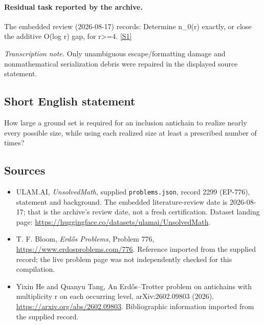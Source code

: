 \documentclass[11pt,a4paper]{article}
\newcommand{\sref}[2]{\hyperlink{source:#1:#2}{[S#2]}}
\begin{document}
\paragraph{Residual task reported by the archive.}

The embedded review (2026-08-17) records: Determine n\_0(r) exactly, or close the additive O(log r) gap, for r>=4. \sref{2299}{1}

{\small\emph{Transcription note.} Only unambiguous escape/formatting damage and nonmathematical serialization debris were repaired in the displayed source statement.}

\subsection{Short English statement}

How large a ground set is required for an inclusion antichain to realize nearly every possible size, while using each realized size at least a prescribed number of times?

\subsection{Sources}

{\small

\begin{itemize}

\item[\hypertarget{source:2299:1}{S1}] ULAM.AI, \emph{UnsolvedMath}, supplied \texttt{problems.json}, record 2299 (EP-776), statement and background. The embedded literature-review date is 2026-08-17; that is the archive’s review date, not a fresh certification. Dataset landing page: \url{https://huggingface.co/datasets/ulamai/UnsolvedMath}.

\item[\hypertarget{source:2299:2}{S2}] T. F. Bloom, \emph{Erdős Problems}, Problem 776, \url{https://www.erdosproblems.com/776}. Reference imported from the supplied record; the live problem page was not independently checked for this compilation.

\item[\hypertarget{source:2299:3}{S3}] Yixin He and Quanyu Tang, An Erdős--Trotter problem on antichains with multiplicity r on each occurring level, arXiv:2602.09803 (2026). \url{https://arxiv.org/abs/2602.09803}. Bibliographic information imported from the supplied record.

\end{itemize}

}

\label{end:2299}
\end{document}
